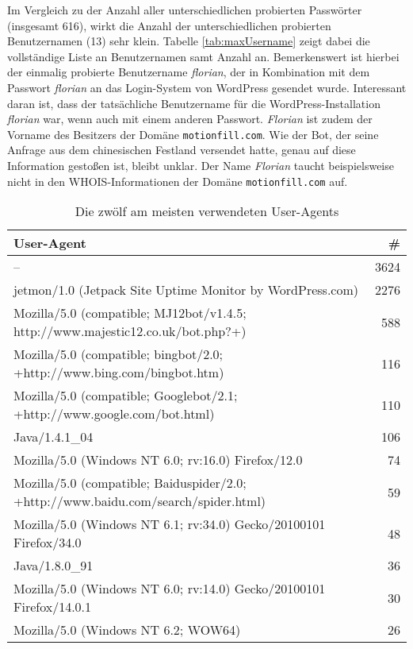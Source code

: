 Im Vergleich zu der Anzahl aller unterschiedlichen probierten Passwörter
(insgesamt 616), wirkt die Anzahl der unterschiedlichen probierten
Benutzernamen (13) sehr klein. Tabelle \ref{tab:maxUsername} zeigt dabei die
vollständige Liste an Benutzernamen samt Anzahl an. Bemerkenswert ist hierbei
der einmalig probierte Benutzername \emph{florian}, der in Kombination mit dem
Passwort \emph{florian} an das Login-System von WordPress gesendet wurde.
Interessant daran ist, dass der tatsächliche Benutzername für die
WordPress-Installation \emph{florian} war, wenn auch mit einem anderen
Passwort. \emph{Florian} ist zudem der Vorname des Besitzers der Domäne
\texttt{motionfill.com}. Wie der Bot, der seine Anfrage aus dem
chinesischen Festland versendet hatte, genau auf diese Information gestoßen ist,
bleibt unklar. Der Name \emph{Florian} taucht beispielsweise nicht in den
WHOIS-Informationen der Domäne \texttt{motionfill.com} auf.

\begin{table}[h]
  \begin{tabularx}{\textwidth}{ X|r }
    \textbf{User-Agent} & \textbf{\#}\\
    \hline
    – & 3624 \\
    jetmon/1.0 (Jetpack Site Uptime Monitor by WordPress.com) & 2276 \\
    Mozilla/5.0 (compatible; MJ12bot/v1.4.5; http://www.majestic12.co.uk/bot.php?+) & 588 \\
    Mozilla/5.0 (compatible; bingbot/2.0; +http://www.bing.com/bingbot.htm) & 116 \\
    Mozilla/5.0 (compatible; Googlebot/2.1; +http://www.google.com/bot.html) & 110 \\
    Java/1.4.1\_04 & 106 \\
    Mozilla/5.0 (Windows NT 6.0; rv:16.0) Firefox/12.0 & 74 \\
    Mozilla/5.0 (compatible; Baiduspider/2.0; +http://www.baidu.com/search/spider.html) & 59 \\
    Mozilla/5.0 (Windows NT 6.1; rv:34.0) Gecko/20100101 Firefox/34.0 & 48 \\
    Java/1.8.0\_91 & 36 \\
    Mozilla/5.0 (Windows NT 6.0; rv:14.0) Gecko/20100101 Firefox/14.0.1 & 30 \\
    Mozilla/5.0 (Windows NT 6.2; WOW64) & 26 \\
  \end{tabularx}
  
  \caption{Die zwölf am meisten verwendeten User-Agents}
  \label{tab:maxUseragent}
\end{table}

